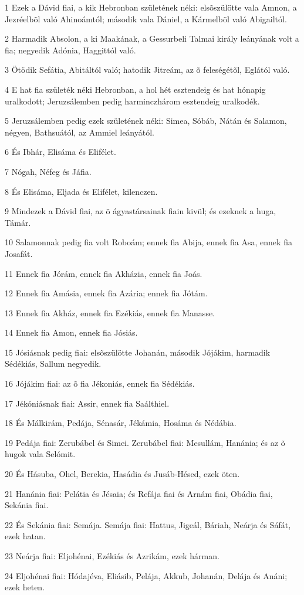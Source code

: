 \par 1 Ezek a Dávid fiai, a kik Hebronban születének néki: elsõszülötte vala Amnon, a Jezréelbõl való Ahinoámtól; második vala Dániel, a Kármelbõl való Abigailtól.
\par 2 Harmadik Absolon, a ki Maakának, a Gessurbeli Talmai király leányának volt a fia; negyedik Adónia, Haggittól való.
\par 3 Ötödik Sefátia, Abitáltól való; hatodik Jitreám, az õ feleségétõl, Eglától való.
\par 4 E hat fia születék néki Hebronban, a hol hét esztendeig és hat hónapig uralkodott; Jeruzsálemben pedig harminczhárom esztendeig uralkodék.
\par 5 Jeruzsálemben pedig ezek születének néki: Simea, Sóbáb, Nátán és Salamon, négyen, Bathsuától, az Ammiel leányától.
\par 6 És Ibhár, Elisáma és Elifélet.
\par 7 Nógah, Néfeg és Jáfia.
\par 8 És Elisáma, Eljada és Elifélet, kilenczen.
\par 9 Mindezek a Dávid fiai, az õ ágyastársainak fiain kivül; és ezeknek a huga, Támár.
\par 10 Salamonnak pedig fia volt Roboám; ennek fia Abija, ennek fia Asa, ennek fia Josafát.
\par 11 Ennek fia Jórám, ennek fia Akházia, ennek fia Joás.
\par 12 Ennek fia Amásia, ennek fia Azária; ennek fia Jótám.
\par 13 Ennek fia Akház, ennek  fia Ezékiás, ennek fia Manasse.
\par 14 Ennek fia Amon, ennek fia Jósiás.
\par 15 Jósiásnak pedig fiai: elsõszülötte Johanán, második Jójákim, harmadik Sédékiás, Sallum negyedik.
\par 16 Jójákim fiai: az õ fia Jékoniás, ennek fia Sédékiás.
\par 17 Jékóniásnak fiai: Assir, ennek fia Saálthiel.
\par 18 És Málkirám, Pedája, Sénasár, Jékámia, Hosáma és Nédábia.
\par 19 Pedája fiai: Zerubábel és Simei. Zerubábel fiai: Mesullám, Hanánia; és az õ hugok vala Selómit.
\par 20 És Hásuba, Ohel, Berekia, Hasádia és Jusáb-Hésed, ezek öten.
\par 21 Hanánia fiai: Pelátia és Jésaia; és Refája fiai és Arnám fiai, Obádia fiai, Sekánia fiai.
\par 22 És Sekánia fiai: Semája. Semája fiai: Hattus, Jigeál, Báriah, Neárja és Sáfát, ezek hatan.
\par 23 Neárja fiai: Eljohénai, Ezékiás és Azrikám, ezek hárman.
\par 24 Eljohénai fiai: Hódajéva, Eliásib, Pelája, Akkub, Johanán, Delája és Anáni; ezek heten.

